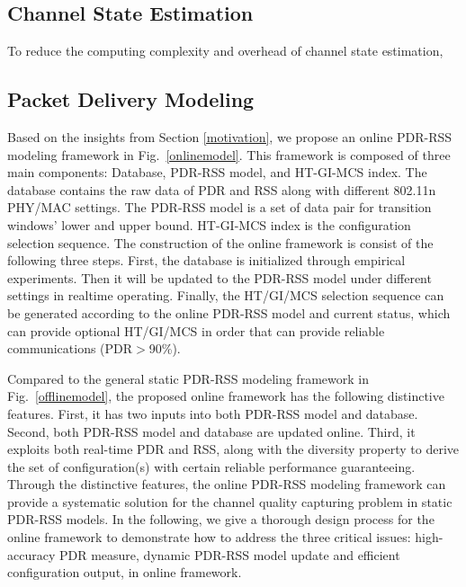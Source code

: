 \documentclass[draftclsnofoot,journal,onecolumn,11pt]{IEEEtran}
\begin{document}
\subsection{Channel State Estimation} \label{sect:estimation}
To reduce the computing complexity and overhead of channel state estimation,

\subsection{Packet Delivery Modeling} \label{sect:modeling}
Based on the insights from Section \ref{motivation}, we propose an online PDR-RSS modeling framework in Fig.~\ref{onlinemodel}. This framework is composed of three main components: Database, PDR-RSS model, and HT-GI-MCS index. The database contains the raw data of PDR and RSS along with different 802.11n PHY/MAC settings. The PDR-RSS model is a set of data pair for transition windows' lower and upper bound. HT-GI-MCS index is the configuration selection sequence. The construction of the online framework is consist of the following three steps. First, the database is initialized through empirical experiments. Then it will be updated to the PDR-RSS model under different settings in realtime operating. Finally, the HT/GI/MCS selection sequence can be generated according to the online PDR-RSS model and current status, which can provide optional HT/GI/MCS in order that can provide reliable communications (PDR$>$90\%).

Compared to the general static PDR-RSS modeling framework in Fig.~\ref{offlinemodel}, the proposed online framework has the following distinctive features. First, it has two inputs into both PDR-RSS model and database. Second, both PDR-RSS model and database are updated online. Third, it exploits both real-time PDR and RSS, along with the diversity property to derive the set of configuration(s) with certain reliable performance guaranteeing. Through the distinctive features, the online PDR-RSS modeling framework can provide a systematic solution for the channel quality capturing problem in static PDR-RSS models. In the following, we give a thorough design process for the online framework to demonstrate how to address the three critical issues: high-accuracy PDR measure, dynamic PDR-RSS model update and efficient configuration output, in online framework.
\end{document}

